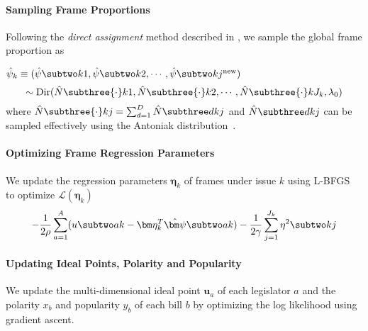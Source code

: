 \paragraph{Sampling Frame Proportions}

Following the \textit{direct assignment} method described in , we sample the global frame proportion as 

$\hat{\psi}_k \equiv (\hat{\psi} \subtwo k1, \hat{\psi} \subtwo k2, \cdots, \hat{\psi} \subtwo k{j^{\mbox{\scriptsize new}}})$
\begin{equation}
 \sim \mbox{Dir} (\hat{N} \subthree {\cdot}k1, \hat{N} \subthree {\cdot}k2,
 \cdots, \hat{N} \subthree {\cdot}k{J_k}, \lambda_0)
\end{equation}
where $\hat{N} \subthree {\cdot}kj = \sum_{d=1}^D \hat{N} \subthree dkj$ and $\hat{N} \subthree
dkj$ can be sampled effectively using the Antoniak distribution~\cite{Aantoniak:AS74}.






\paragraph{Optimizing Frame Regression Parameters}
\label{subsec:c6_upadte_eta}

We update the regression parameters $\bm \eta_k$ of frames under issue $k$ using
L-BFGS~\cite{Liu:MP89:lbfgs} to optimize $\mathcal{L}(\bm \eta_k)$
\begin{equation}
  - \frac{1}{2 \rho} \sum_{a=1}^A (u \subtwo ak - \bm \eta_k^T \hat{\bm \psi} \subtwo ak)
  - \frac{1}{2 \gamma} \sum_{j=1}^{J_k} \eta^2 \subtwo kj
\end{equation}

\paragraph{Updating Ideal Points, Polarity and Popularity}
\label{subsec:c6_upadte_ideal_point}

We update the multi-dimensional ideal point $\bm u_a$ of each legislator $a$ and
the polarity $x_b$ and popularity $y_b$ of each bill $b$ by optimizing the log
likelihood using gradient ascent.















